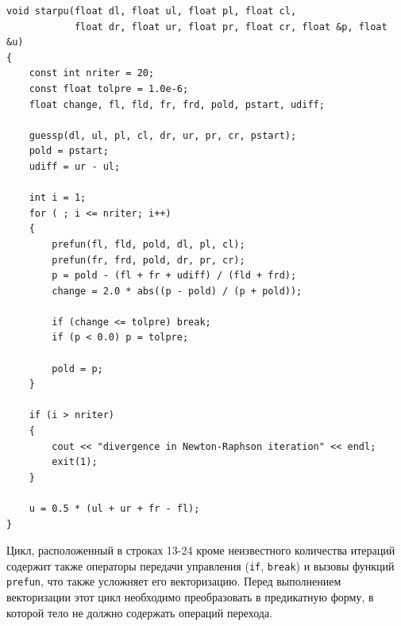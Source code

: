 \begin{lstlisting}[caption={Оригинальная версия функции \texttt{starpu}.},label={lst:text_4_vec_riem_starpu}]
void starpu(float dl, float ul, float pl, float cl,
            float dr, float ur, float pr, float cr, float &p, float &u)
{
    const int nriter = 20;
    const float tolpre = 1.0e-6;
    float change, fl, fld, fr, frd, pold, pstart, udiff;

    guessp(dl, ul, pl, cl, dr, ur, pr, cr, pstart);
    pold = pstart;
    udiff = ur - ul;

    int i = 1;
    for ( ; i <= nriter; i++)
    {
        prefun(fl, fld, pold, dl, pl, cl);
        prefun(fr, frd, pold, dr, pr, cr);
        p = pold - (fl + fr + udiff) / (fld + frd);
        change = 2.0 * abs((p - pold) / (p + pold));

        if (change <= tolpre) break;
        if (p < 0.0) p = tolpre;

        pold = p;
    }

    if (i > nriter)
    {
        cout << "divergence in Newton-Raphson iteration" << endl;
        exit(1);
    }

    u = 0.5 * (ul + ur + fr - fl);
}
\end{lstlisting}

Цикл, расположенный в строках 13-24 кроме неизвестного количества итераций содержит также операторы передачи управления (\texttt{if}, \texttt{break}) и вызовы функций \texttt{prefun}, что также усложняет его векторизацию.
Перед выполнением векторизации этот цикл необходимо преобразовать в предикатную форму\label{term:predicate_view3}, в которой тело не должно содержать операций перехода.

